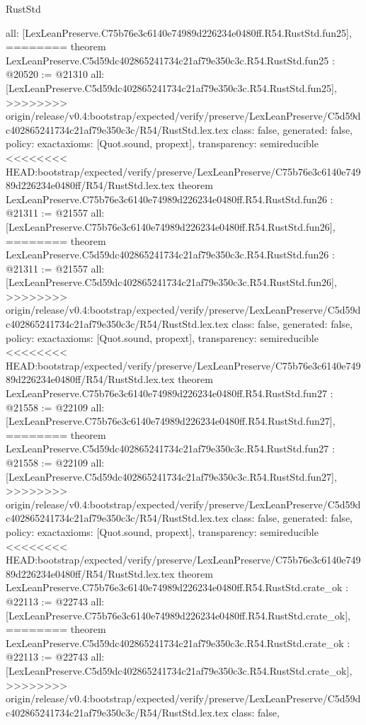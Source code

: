 \begin{lexlean}{RustStd}
\begin{coremodule}
{\begin{coremodule}
{{{{{{{{{{{{{{{{{{{{{{{{{{{{  all: [LexLeanPreserve.C75b76e3c6140e74989d226234e0480ff.R54.RustStd.fun25],
========
theorem LexLeanPreserve.C5d59dc402865241734c21af79e350c3c.R54.RustStd.fun25 : @20520 := @21310 {
  all: [LexLeanPreserve.C5d59dc402865241734c21af79e350c3c.R54.RustStd.fun25],
>>>>>>>> origin/release/v0.4:bootstrap/expected/verify/preserve/LexLeanPreserve/C5d59dc402865241734c21af79e350c3c/R54/RustStd.lex.tex
  class: false,
  generated: false,
  policy: exact{axioms: [Quot.sound, propext]},
  transparency: semireducible
}
<<<<<<<< HEAD:bootstrap/expected/verify/preserve/LexLeanPreserve/C75b76e3c6140e74989d226234e0480ff/R54/RustStd.lex.tex
theorem LexLeanPreserve.C75b76e3c6140e74989d226234e0480ff.R54.RustStd.fun26 : @21311 := @21557 {
  all: [LexLeanPreserve.C75b76e3c6140e74989d226234e0480ff.R54.RustStd.fun26],
========
theorem LexLeanPreserve.C5d59dc402865241734c21af79e350c3c.R54.RustStd.fun26 : @21311 := @21557 {
  all: [LexLeanPreserve.C5d59dc402865241734c21af79e350c3c.R54.RustStd.fun26],
>>>>>>>> origin/release/v0.4:bootstrap/expected/verify/preserve/LexLeanPreserve/C5d59dc402865241734c21af79e350c3c/R54/RustStd.lex.tex
  class: false,
  generated: false,
  policy: exact{axioms: [Quot.sound, propext]},
  transparency: semireducible
}
<<<<<<<< HEAD:bootstrap/expected/verify/preserve/LexLeanPreserve/C75b76e3c6140e74989d226234e0480ff/R54/RustStd.lex.tex
theorem LexLeanPreserve.C75b76e3c6140e74989d226234e0480ff.R54.RustStd.fun27 : @21558 := @22109 {
  all: [LexLeanPreserve.C75b76e3c6140e74989d226234e0480ff.R54.RustStd.fun27],
========
theorem LexLeanPreserve.C5d59dc402865241734c21af79e350c3c.R54.RustStd.fun27 : @21558 := @22109 {
  all: [LexLeanPreserve.C5d59dc402865241734c21af79e350c3c.R54.RustStd.fun27],
>>>>>>>> origin/release/v0.4:bootstrap/expected/verify/preserve/LexLeanPreserve/C5d59dc402865241734c21af79e350c3c/R54/RustStd.lex.tex
  class: false,
  generated: false,
  policy: exact{axioms: [Quot.sound, propext]},
  transparency: semireducible
}
<<<<<<<< HEAD:bootstrap/expected/verify/preserve/LexLeanPreserve/C75b76e3c6140e74989d226234e0480ff/R54/RustStd.lex.tex
theorem LexLeanPreserve.C75b76e3c6140e74989d226234e0480ff.R54.RustStd.crate_ok : @22113 := @22743 {
  all: [LexLeanPreserve.C75b76e3c6140e74989d226234e0480ff.R54.RustStd.crate_ok],
========
theorem LexLeanPreserve.C5d59dc402865241734c21af79e350c3c.R54.RustStd.crate_ok : @22113 := @22743 {
  all: [LexLeanPreserve.C5d59dc402865241734c21af79e350c3c.R54.RustStd.crate_ok],
>>>>>>>> origin/release/v0.4:bootstrap/expected/verify/preserve/LexLeanPreserve/C5d59dc402865241734c21af79e350c3c/R54/RustStd.lex.tex
  class: false,
}}}}}}}}}}}}}}}}}}}}}}}}}}}}}}}}
\end{coremodule}}
\end{coremodule}
\end{lexlean}
